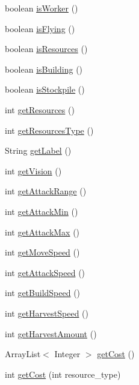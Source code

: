 \begin{DoxyCompactItemize}
boolean \hyperlink{classrts_1_1units_1_1_unit_aa76c7f9a2fb734436c938b566939aa7b}{isWorker} ()
\item 
boolean \hyperlink{classrts_1_1units_1_1_unit_a42f54aefc0fd60fb198a0ccf2297833f}{isFlying} ()
\item 
boolean \hyperlink{classrts_1_1units_1_1_unit_a8f4c4986ae18671c0bbf409187d53f71}{isResources} ()
\item 
boolean \hyperlink{classrts_1_1units_1_1_unit_a8134378c251e0b7b5cb4f42c187c1287}{isBuilding} ()
\item 
boolean \hyperlink{classrts_1_1units_1_1_unit_a12018d814677d2c760df1ecddf498f08}{isStockpile} ()
\item 
int \hyperlink{classrts_1_1units_1_1_unit_aa41ddb4c79b9e7c498284ebcedac7076}{getResources} ()
\item 
int \hyperlink{classrts_1_1units_1_1_unit_a6da5a902c31651ceda2aa42c63ab445c}{getResourcesType} ()
\item 
String \hyperlink{classrts_1_1units_1_1_unit_a14599f15b7b0651bffc8a320fc6aaca8}{getLabel} ()
\item 
int \hyperlink{classrts_1_1units_1_1_unit_a2aa7164089d7d5df304bdc297de909f9}{getVision} ()
\item 
int \hyperlink{classrts_1_1units_1_1_unit_a93ce4d05cbcd72975e0d58d9adf44d64}{getAttackRange} ()
\item 
int \hyperlink{classrts_1_1units_1_1_unit_a87a87fa5cb38f6807b11ec72d9bbc44f}{getAttackMin} ()
\item 
int \hyperlink{classrts_1_1units_1_1_unit_a1db19a8c285bdb94e785e306050e717e}{getAttackMax} ()
\item 
int \hyperlink{classrts_1_1units_1_1_unit_a11d3028f183139348bffdd90f8c72dae}{getMoveSpeed} ()
\item 
int \hyperlink{classrts_1_1units_1_1_unit_a4de9d0b362005c2a92c6a8e0c905b02a}{getAttackSpeed} ()
\item 
int \hyperlink{classrts_1_1units_1_1_unit_a2ae62e62845c92ffc7dc65c6af18358a}{getBuildSpeed} ()
\item 
int \hyperlink{classrts_1_1units_1_1_unit_a433c2cd844c8b13c4c4c663b35b258ee}{getHarvestSpeed} ()
\item 
int \hyperlink{classrts_1_1units_1_1_unit_a8ae1eba5cf3d093583ba8c9178bf6392}{getHarvestAmount} ()
\item 
ArrayList$<$ Integer $>$ \hyperlink{classrts_1_1units_1_1_unit_a932871d3f1e1279f4beb6137ec35317b}{getCost} ()
\item 
int \hyperlink{classrts_1_1units_1_1_unit_a148c333285ad3bac9395819a0f5ac49c}{getCost} (int resource\_\-type)

\end{DoxyCompactItemize}
